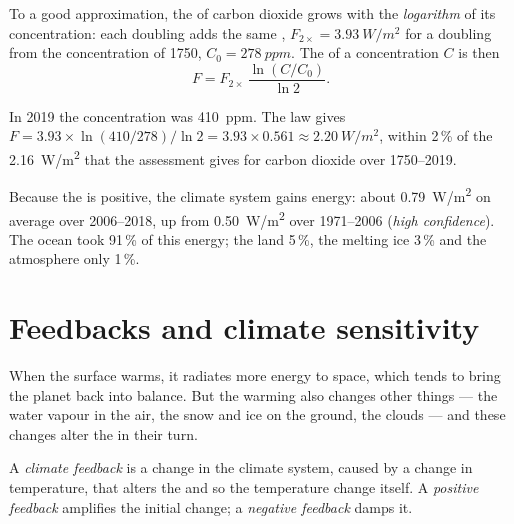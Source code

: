 \begin{proposition}\label{prop:g12:climate-change:log}
To a good approximation, the  of carbon dioxide grows with the
\emph{logarithm} of its concentration: each doubling adds the same ,
$F_{2\times} = \qty{3.93}{W/m^2}$ for a doubling from the concentration of
1750, $C_0 = \qty{278}{ppm}$. The  of a concentration $C$ is then
\[
  F = F_{2\times}\,\frac{\ln (C/C_0)}{\ln 2}.
\]
\end{proposition}

\begin{example}\label{ex:g12:climate-change:check}
In 2019 the concentration was \qty{410}{ppm}. The law gives
$F = 3.93 \times \ln(410/278)/\ln 2 = 3.93 \times 0.561 \approx
\qty{2.20}{W/m^2}$, within 2\,\% of the \qty{2.16}{W/m^2} that the
assessment gives for carbon dioxide over 1750--2019.
\end{example}

\begin{proposition}\label{prop:g12:climate-change:heating}
Because the  is positive, the climate system gains energy: about
\qty{0.79}{W/m^2} on average over 2006--2018, up from \qty{0.50}{W/m^2} over
1971--2006 (\emph{high confidence}). The ocean took 91\,\% of this energy; the
land 5\,\%, the melting ice 3\,\% and the atmosphere only 1\,\%.
\end{proposition}

\section{Feedbacks and climate sensitivity}

When the surface warms, it radiates more energy to space, which tends to
bring the planet back into balance. But the warming also changes other
things --- the water vapour in the air, the snow and ice on the ground, the
clouds --- and these changes alter the  in their turn.

\begin{definition}\label{def:g12:climate-change:feedback}
A \emph{climate feedback} is a change in the climate
system, caused by a change in temperature, that alters the 
and so the temperature change itself. A \emph{positive feedback} amplifies
the initial change; a \emph{negative feedback} damps it.
\end{definition}

